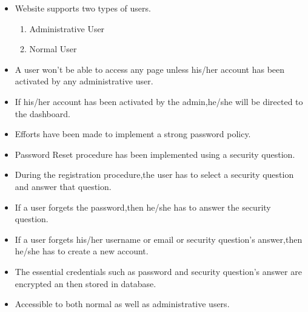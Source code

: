 \documentclass[a4paper,12pt,oneside]{book}
\begin{document}
\begin{enumerate}
\begin{itemize}
\begin{enumerate}
\begin{itemize}
                    \item{Website supports two types of users.}
                        \begin{enumerate}
                            \item{Administrative User}
                            \item{Normal User}
                        \end{enumerate}
                    \item{A user won't be able to access any page unless his/her account has been activated by any administrative user.}
                    \item{If his/her account has been activated by the admin,he/she will be directed to the dashboard.}
                    \item{Efforts have been made to implement a strong password policy.}
                    \item{Password Reset procedure has been implemented using a security question.}
                    \item{During the registration procedure,the user has to select a security question and answer that question.}
                    \item{If a user forgets the password,then he/she has to answer the security question.}
                    \item{If a user forgets his/her username or email or security question's answer,then he/she has to create a new account.}
                    \item{The essential credentials such as password and security question's answer are encrypted an then stored in database.}
                    \item{Accessible to both normal as well as administrative users.}
                        

\end{itemize}
\end{enumerate}
\end{itemize}
\end{enumerate}
\end{document}
